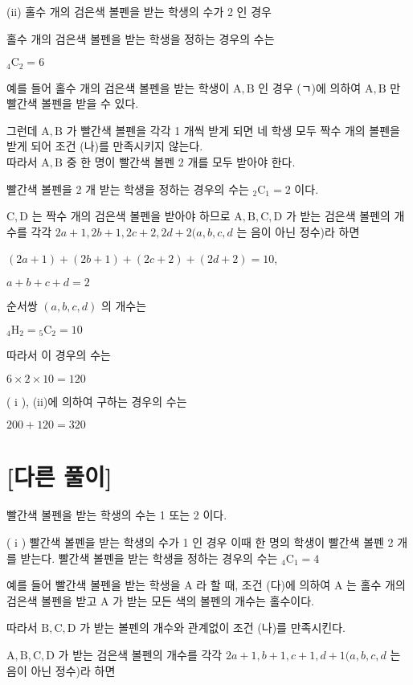 \documentclass[10pt]{article}
\begin{document}
(ii) 홀수 개의 검은색 볼펜을 받는 학생의 수가 2 인 경우

홀수 개의 검은색 볼펜을 받는 학생을 정하는 경우의 수는

\({ }_{4} \mathrm{C}_{2}=6\)

예를 들어 홀수 개의 검은색 볼펜을 받는 학생이 \(\mathrm{A}, \mathrm{B}\) 인 경우 (ㄱ)에 의하여 \(\mathrm{A}, \mathrm{B}\) 만 빨간색 볼펜을 받을 수 있다.

그런데 \(\mathrm{A}, \mathrm{B}\) 가 빨간색 볼펜을 각각 1 개씩 받게 되면 네 학생 모두 짝수 개의 볼펜을 받게 되어 조건 (나)를 만족시키지 않는다.\\
따라서 \(\mathrm{A}, \mathrm{B}\) 중 한 명이 빨간색 볼펜 2 개를 모두 받아야 한다.

빨간색 볼펜을 2 개 받는 학생을 정하는 경우의 수는 \({ }_{2} \mathrm{C}_{1}=2\) 이다.

\(\mathrm{C}, \mathrm{D}\) 는 짝수 개의 검은색 볼펜을 받아야 하므로 \(\mathrm{A}, \mathrm{B}, \mathrm{C}, \mathrm{D}\) 가 받는 검은색 볼펜의 개수를 각각 \(2 a+1,2 b+1,2 c+2,2 d+2(a, b, c, d\) 는 음이 아닌 정수)라 하면

\((2 a+1)+(2 b+1)+(2 c+2)+(2 d+2)=10\),

\(a+b+c+d=2\)

순서쌍 \((a, b, c, d)\) 의 개수는

\({ }_{4} \mathrm{H}_{2}={ }_{5} \mathrm{C}_{2}=10\)

따라서 이 경우의 수는

\(6 \times 2 \times 10=120\)

( i ), (ii)에 의하여 구하는 경우의 수는

\(200+120=320\)

\section*{[다른 풀이]}
빨간색 볼펜을 받는 학생의 수는 1 또는 2 이다.

( i ) 빨간색 볼펜을 받는 학생의 수가 1 인 경우 이때 한 명의 학생이 빨간색 볼펜 2 개를 받는다. 빨간색 볼펜을 받는 학생을 정하는 경우의 수는 \({ }_{4} \mathrm{C}_{1}=4\)

예를 들어 빨간색 볼펜을 받는 학생을 A 라 할 때, 조건 (다)에 의하여 A 는 홀수 개의 검은색 볼펜을 받고 A 가 받는 모든 색의 볼펜의 개수는 홀수이다.

따라서 \(\mathrm{B}, \mathrm{C}, \mathrm{D}\) 가 받는 볼펜의 개수와 관계없이 조건 (나)를 만족시킨다.

\(\mathrm{A}, \mathrm{B}, \mathrm{C}, \mathrm{D}\) 가 받는 검은색 볼펜의 개수를 각각 \(2 a+1, b+1, c+1, d+1(a, b, c, d\) 는 음이 아닌 정수)라 하면
\end{document}
